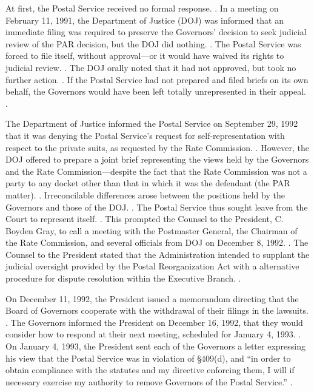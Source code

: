 \documentclass[12pt,\documentclassflag]{lawbrief}
\begin{document}
At first, the Postal Service received no formal response.  \See {}.  In a meeting on February 11, 1991, the Department of Justice (DOJ) was informed that an immediate filing was required to preserve the Governors' decision to seek judicial review of the PAR decision, but the DOJ did nothing.  \See \id[\P 7]. The Postal Service was forced to file itself, without approval---or it would have waived its rights to judicial review. \See \id[\P 8].  The DOJ orally noted that it had not approved, but took no further action. \See \id.  If the Postal Service had not prepared and filed briefs on its own behalf, the Governors would have been left totally unrepresented in their appeal. \See \id[\P 11]. 

The Department of Justice informed the Postal Service on September 29, 1992 that it was denying the Postal Service's request for self-representation with respect to the private suits, as requested by the Rate Commission. \See \id[\P 12, Attachment B].  However, the DOJ offered to prepare a joint brief representing the views held by the Governors and the Rate Commission---despite the fact that the Rate Commission was not a party to any docket other than that in which it was the defendant (the PAR matter). \See \id[\P 13].  Irreconcilable differences arose between the positions held by the Governors and those of the DOJ. \See \id[\P 17].  The Postal Service thus sought leave from the Court to represent itself. \See \id[\P 18].  This prompted the Counsel to the President, C. Boyden Gray, to call a meeting with the Postmaster General, the Chairman of the Rate Commission, and several officials from DOJ on December 8, 1992. \See \id[\P 20].  The Counsel to the President stated that the Administration intended to supplant the judicial oversight provided by the Postal Reorganization Act with a alternative procedure for dispute resolution within the Executive Branch. \See \id[\P 22, Attachment J].

On December 11, 1992, the President issued a memorandum directing that the Board of Governors cooperate with the withdrawal of their filings in the lawsuits. \See \id[\P 23, Attachment K]. The Governors informed the President on December 16, 1992, that they would consider how to respond at their next meeting, scheduled for January 4, 1993.  \See \id[\P 24, Attachment M].  On January 4, 1993, the President sent each of the Governors a letter expressing his view that the Postal Service was in violation of \S409(d), and ``in order to obtain compliance with the statutes and my directive enforcing them, I will if necessary exercise my authority to remove Governors of the Postal Service.'' \See {}.
\end{document}

